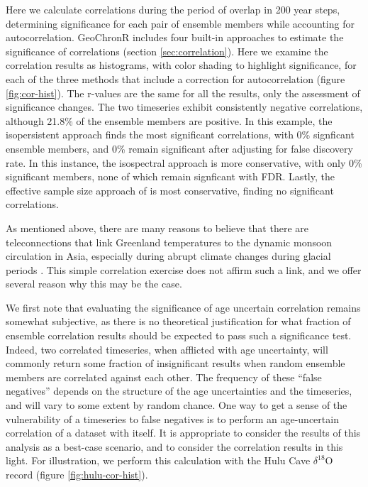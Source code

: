 \documentclass[gchron, manuscript]{copernicus}
\begin{document}
Here we calculate correlations during the period of overlap in 200 year steps, determining significance for each pair of ensemble members while accounting for autocorrelation.
GeoChronR includes four built-in approaches to estimate the significance of correlations (section \ref{sec:correlation}).
Here we examine the correlation results as histograms, with color shading to highlight significance, for each of the three methods that include a correction for autocorrelation (figure \ref{fig:cor-hist}).
The r-values are the same for all the results, only the assessment of significance changes.
The two timeseries exhibit consistently negative correlations, although 21.8\% of the ensemble members are positive.
In this example, the isopersistent approach finds the most significant correlations, with 0\% signficant ensemble members, and 0\% remain significant after adjusting for false discovery rate.
In this instance, the isospectral approach is more conservative, with only 0\% significant members, none of which remain signficant with FDR.
Lastly, the effective sample size approach of \citet{dawdy1964statistical} is most conservative, finding no significant correlations.

As mentioned above, there are many reasons to believe that there are teleconnections that link Greenland temperatures to the dynamic monsoon circulation in Asia, especially during abrupt climate changes during glacial periods \citep[e.g.][]{liu2013links, duan2016onset, zhang2019asian}.
This simple correlation exercise does not affirm such a link, and we offer several reason why this may be the case.

We first note that evaluating the significance of age uncertain correlation remains somewhat subjective, as there is no theoretical justification for what fraction of ensemble correlation results should be expected to pass such a significance test.
Indeed, two correlated timeseries, when afflicted with age uncertainty, will commonly return some fraction of insignificant results when random ensemble members are correlated against each other.
The frequency of these ``false negatives'' depends on the structure of the age uncertainties and the timeseries, and will vary to some extent by random chance.
One way to get a sense of the vulnerability of a timeseries to false negatives is to perform an age-uncertain correlation of a dataset with itself.
It is appropriate to consider the results of this analysis as a best-case scenario, and to consider the correlation results in this light.
For illustration, we perform this calculation with the Hulu Cave \(\delta^{18}\)O record (figure \ref{fig:hulu-cor-hist}).
\end{document}
